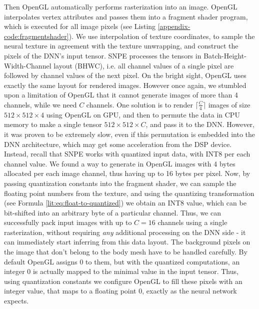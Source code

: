 Then OpenGL automatically performs rasterization into an image. OpenGL interpolates vertex attributes and passes them into a fragment shader program, which is executed for all image pixels (see Listing \ref{appendix-code:fragmentshader}). We use interpolation of texture coordinates, to sample the neural texture in agreement with the texture unwrapping, and construct the pixels of the DNN's input tensor. SNPE processes the tensors in Batch-Height-Width-Channel layout (BHWC), i.e. all channel values of a single pixel are followed by channel values of the next pixel. On the bright sight, OpenGL uses exactly the same layout for rendered images. However once again, we stumbled upon a limitation of OpenGL that it cannot generate images of more than 4 channels, while we need $C$ channels. One solution is to render $\lceil \tfrac{C}{4} \rceil$ images of size $512 \times 512 \times 4$ using OpenGL on GPU, and then to permute the data in CPU memory to make a single tensor $512 \times 512 \times C$, and pass it to the DNN. However, it was proven to be extremely slow, even if this permutation is embedded into the DNN architecture, which may get some acceleration from the DSP device. Instead, recall that SNPE works with quantized input data, with INT8 per each channel value. We found a way to generate in OpenGL images with 4 bytes allocated per each image channel, thus having up to 16 bytes per pixel. Now, by passing quantization constants into the fragment shader, we can sample the floating point numbers from the texture, and using the quantizing transformation (see Formula \ref{lit:eq:float-to-quantized}) we obtain an INT8 value, which can be bit-shifted into an arbitrary byte of a particular channel. Thus, we can successfully pack input images with up to $C = 16$ channels using a single rasterization, without requiring \textit{any} additional processing on the DNN side - it can immediately start inferring from this data layout. The background pixels on the image that don't belong to the body mesh have to be handled carefully. By default OpenGL assigns 0 to them, but with the quantized computations, an integer 0 is actually mapped to the minimal value in the input tensor. Thus, using quantization constants we configure OpenGL to fill these pixels with an integer value, that maps to a floating point 0, exactly as the neural network expects.

